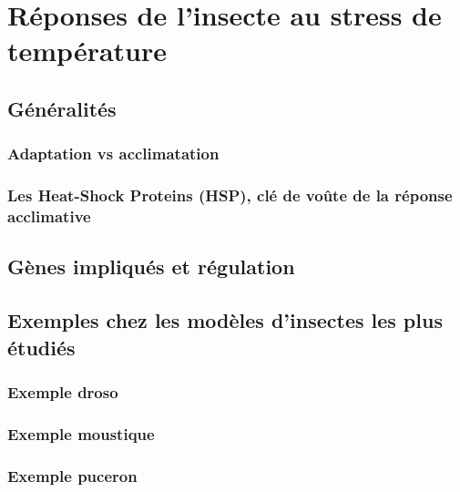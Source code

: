 \chapter{Réponses de l’insecte au stress de température} %
\label{chap:repstress}
	
	\section{Généralités} %
	\label{sec:g_n_ralit_s}
		

		\subsection{Adaptation vs acclimatation} %
		\label{sub:adaptation_vs_accilmatation}
			

%			

		\subsection{Les Heat-Shock Proteins (HSP), clé de voûte de la réponse acclimative} %
		\label{sub:generalites_HSP}
					

	\section{Gènes impliqués et régulation} %
	\label{sec:genes}
		

	\section{Exemples chez les modèles d'insectes les plus étudiés} %
	\label{sec:exemples_modeles}
		

		\subsection{Exemple droso} %
		\label{sub:exemple_droso}
			

		\subsection{Exemple moustique} %
		\label{sub:exemple_moustique}
			

		\subsection{Exemple puceron} %
		\label{sub:exemple_puceron}
			

